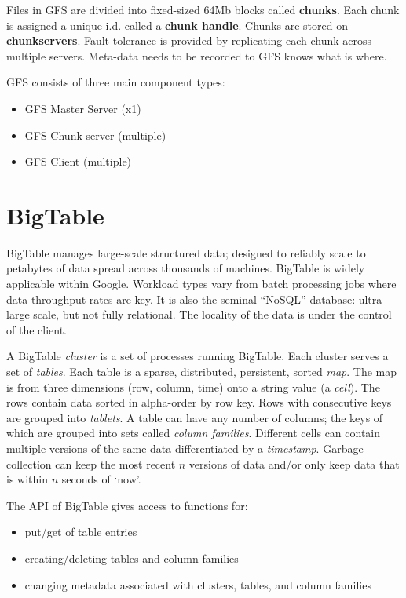 \documentclass[11pt,a4paper,titlepage,dvipsnames,cmyk]{scrartcl}
\begin{document}
Files in GFS are divided into fixed-sized 64Mb blocks called \textbf{chunks}. Each chunk is assigned a unique i.d. called a \textbf{chunk handle}. Chunks are stored on \textbf{chunkservers}. Fault tolerance is provided by replicating each chunk across multiple servers. Meta-data needs to be recorded to GFS knows what is where.

GFS consists of three main component types:
\begin{itemize}
    \item GFS Master Server (x1)
    \item GFS Chunk server (multiple)
    \item GFS Client (multiple)
\end{itemize}

\section{BigTable}
BigTable manages large-scale structured data; designed to reliably scale to petabytes of data spread across thousands of machines. BigTable is widely applicable within Google. Workload types vary from batch processing jobs where data-throughput rates are key. It is also the seminal ``NoSQL'' database: ultra large scale, but not fully relational. The locality of the data is under the control of the client.

A BigTable \textit{cluster} is a set of processes running BigTable. Each cluster serves a set of \textit{tables}. Each table is a sparse, distributed, persistent, sorted \textit{map}. The map is from three dimensions (row, column, time) onto a string value (a \textit{cell}). The rows contain data sorted in alpha-order by row key. Rows with consecutive keys are grouped into \textit{tablets}. A table can have any number of columns; the keys of which are grouped into sets called \textit{column families}. Different cells can contain multiple versions of the same data differentiated by a \textit{timestamp}. Garbage collection can keep the most recent $n$ versions of data and/or only keep data that is within $n$ seconds of `now'.

The API of BigTable gives access to functions for:
\begin{itemize}
    \item put/get of table entries
    \item creating/deleting tables and column families
    \item changing metadata associated with clusters, tables, and column families
\end{itemize}
\end{document}
